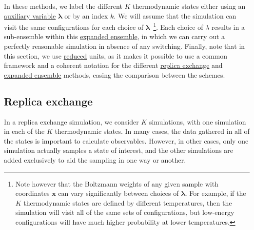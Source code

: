 \documentclass[9pt,review]{livecoms}
\newcommand{\vx}{\mathbf{x}}
\begin{document}
In these methods, we label the different $K$ thermodynamic states either using an \hyperlink{ref:AuxVar} {auxiliary variable} $\mathbf{\lambda}$  or by an index $k$. We will assume that the simulation can visit the same configurations for each choice of $\mathbf{\lambda}$~\footnote{Note however that the Boltzmann weights of any given sample with coordinates $\vx$ can vary significantly between choices of $\mathbf{\lambda}$. For example, if the $K$ thermodynamic states are defined by different temperatures, then the simulation will visit all of the same sets of configurations, but low-energy configurations will have much higher probability at lower temperatures.}. Each choice of $\lambda$ results in a sub-ensemble within this \hyperlink{ref:ExpEns} {expanded ensemble}, in which we can carry out a perfectly reasonable simulation in absence of any switching. Finally, note that in this section, we use \hyperlink{ref:reduced} {reduced} units, as it makes it possible to use a common framework and a coherent notation for the different \hyperlink{ref:ReplEx} {replica exchange} and \hyperlink{ref:ExpEns} {expanded ensemble} methods, easing the comparison between the schemes.

\subsection{Replica exchange}
\label{sec:ReplicaExchange}
In a replica exchange simulation, we consider $K$ simulations, with one simulation in each of the $K$ thermodynamic states. In many cases, the data gathered in all of the states is important to calculate observables. However, in other cases, only one simulation actually samples a state of interest, and the other simulations are added exclusively to aid the sampling in one way or another.
\end{document}
